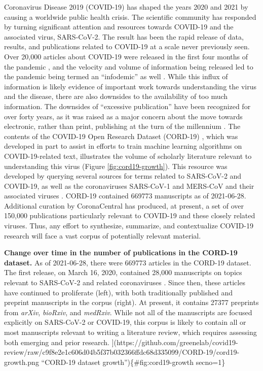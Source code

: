 \documentclass[sigconf]{acmart}
\begin{document}
Coronavirus Disease 2019 (COVID-19) has shaped the years 2020 and 2021 by causing a worldwide public health crisis.
The scientific community has responded by turning significant attention and resources towards COVID-19 and the associated virus, SARS-CoV-2.
The result has been the rapid release of data, results, and publications related to COVID-19 at a scale never previously seen.
Over 20,000 articles about COVID-19 were released in the first four months of the pandemic \citep{7ub6VM4Z}, and the velocity and volume of information being released led to the pandemic being termed an ``infodemic'' as well \citep{7ub6VM4Z, nnfOazAC}.
While this influx of information is likely evidence of important work towards understanding the virus and the disease, there are also downsides to the availability of too much information.
The downsides of ``excessive publication'' have been recognized for over forty years, as it was raised as a major concern about the move towards electronic, rather than print, publishing at the turn of the millennium \citep{DfSr1Ohc}.
The contents of the COVID-19 Open Research Dataset (CORD-19) \citep{CiOwklc6}, which was developed in part to assist in efforts to train machine learning algorithms on COVID-19-related text, illustrates the volume of scholarly literature relevant to understanding this virus (Figure \ref{fig:cord19-growth}).
This resource was developed by querying several sources for terms related to SARS-CoV-2 and COVID-19, as well as the coronaviruses SARS-CoV-1 and MERS-CoV and their associated viruses \citep{CiOwklc6}.
CORD-19 contained 669773 manuscripts as of 2021-06-28.
Additional curation by CoronaCentral \citep{zQ1JIn2J} has produced, at present, a set of over 150,000 publications particularly relevant to COVID-19 and these closely related viruses.
Thus, any effort to synthesize, summarize, and contextualize COVID-19 research will face a vast corpus of potentially relevant material.

\textbf{Change over time in the number of publications in the CORD-19 dataset.}
As of 2021-06-28, there were 669773 articles in the CORD-19 dataset.
The first release, on March 16, 2020, contained 28,000 manuscripts on topics relevant to SARS-CoV-2 and related coronaviruses \citep{CiOwklc6}.
Since then, these articles have continued to proliferate (left), with both traditionally published and preprint manuscripts in the corpus (right).
At present, it contains 27377 preprints from \emph{arXiv}, \emph{bioRxiv}, and \emph{medRxiv}.
While not all of the manuscripts are focused explicitly on SARS-CoV-2 or COVID-19, this corpus is likely to contain all or most manuscripts relevant to writing a literature review, which requires assessing both emerging and prior research.
{]}(https://github.com/greenelab/covid19-review/raw/c9f8e2e1c606d04b5f37b032366ffdc68d335099/CORD-19/cord19-growth.png ``CORD-19 dataset growth'')\{\#fig:cord19-growth secno=1\}
\end{document}
